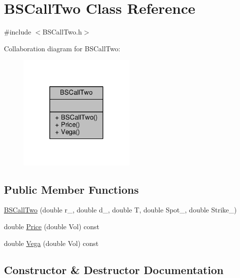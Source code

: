 \hypertarget{classBSCallTwo}{}\section{B\+S\+Call\+Two Class Reference}
\label{classBSCallTwo}


{\ttfamily \#include $<$B\+S\+Call\+Two.\+h$>$}



Collaboration diagram for B\+S\+Call\+Two\+:
\nopagebreak
\begin{figure}[H]
\begin{center}
\leavevmode
\includegraphics[width=161pt]{classBSCallTwo__coll__graph}
\end{center}
\end{figure}
\subsection*{Public Member Functions}
\begin{DoxyCompactItemize}
\item 
\hyperlink{classBSCallTwo_aec615c8420082c0bd886521faa9643d8}{B\+S\+Call\+Two} (double r\+\_\+, double d\+\_\+, double T, double Spot\+\_\+, double Strike\+\_\+)
\item 
double \hyperlink{classBSCallTwo_a665a1b79a859410d1b588c0811f4143a}{Price} (double Vol) const
\item 
double \hyperlink{classBSCallTwo_ab98dc7e0e5218cfc47aac07c700539fa}{Vega} (double Vol) const
\end{DoxyCompactItemize}


\subsection{Constructor \& Destructor Documentation}
\hypertarget{classBSCallTwo_aec615c8420082c0bd886521faa9643d8}{}\label{classBSCallTwo_aec615c8420082c0bd886521faa9643d8} 
